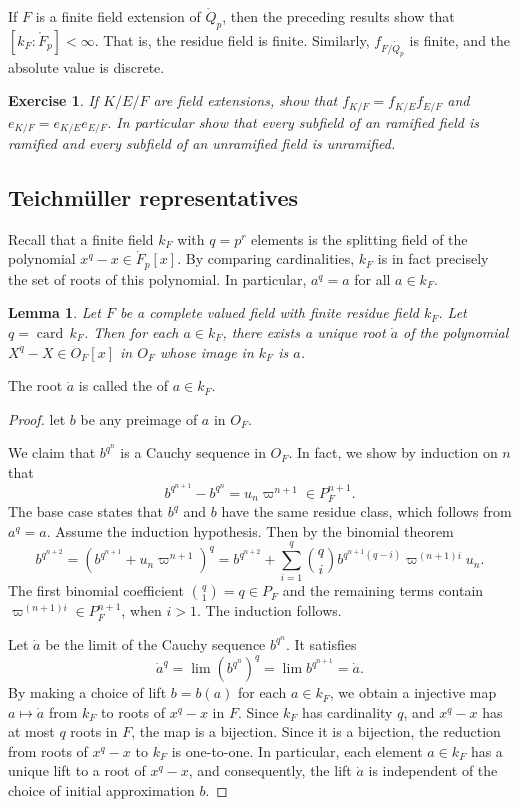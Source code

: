 \documentclass{amsart}
\newtheorem{lemma}[equation]{Lemma}
\newtheorem{exercise}{Exercise}
\def\card#1{\op{card}{#1}}
\def\op#1{{\operatorname{#1}}}
\begin{document}
If $F$ is a finite field extension of $\ring{Q}_p$, then the preceding results
show that $[k_F:\ring{F}_p]<\infty$.  That is, the residue field is finite.
Similarly, $f_{F/\ring{Q}_p}$ is finite, and the absolute value is discrete.

\begin{exercise}\label{ex:e-m}  If $K/E/F$ are field extensions, show that
$f_{K/F}=f_{K/E}f_{E/F}$ and $e_{K/F}=e_{K/E}e_{E/F}$.  In particular show
that every subfield of an ramified field is ramified and every subfield of
an unramified field is unramified.
\end{exercise}

\subsection{Teichm\"uller representatives}

Recall that a finite field $k_F$ with $q=p^r$ elements is the splitting field of 
the polynomial $x^q-x\in \ring{F}_p[x]$.  By comparing cardinalities, $k_F$ is in fact
precisely the set of roots of this polynomial.  In particular, $a^q=a$ for all
$a\in k_F$.

\begin{lemma}  Let $F$ be a complete valued field with finite residue field $k_F$.
Let $q = \card\,k_F$.  Then for each $a\in k_F$, there exists a unique root $\dot a$ of
the polynomial $X^q-X\in O_F[x]$ in $O_F$ whose image in $k_F$ is $a$.
\end{lemma}

The root $\dot a$ is called the  of $a\in k_F$.

\begin{proof} let $b$ be any preimage of $a$ in $O_F$.  

We claim that $b^{q^n}$ is a Cauchy sequence in $O_F$. In fact, we show by induction
on $n$ 
that 
\[
b^{q^{n+1}} - b^{q^n} = u_n\varpi^{n+1} \in P_F^{n+1}.
\]
The base case states that $b^q$ and $b$ have the same residue class, which follows from
 $a^q = a$.
Assume the induction hypothesis.
Then by the binomial theorem
\[
b^{q^{n+2}} = (b^{q^{n+1}} + u_n\varpi^{n+1})^q 
= b^{q^{n+2}} + {\sum_{i=1}^q {q\choose i}b^{q^{n+1}(q-i)} \varpi^{(n+1)i}u_n}.
\]
The first binomial coefficient ${q\choose 1} = q\in P_F$ and the
remaining terms contain $\varpi^{(n+1)i}\in P_F^{n+1}$, when $i>1$. The induction
follows.

Let $\dot a$ be the limit of the Cauchy sequence $b^{q^n}$. 
It satisfies
\[
\dot a ^q = \lim (b^{q^n})^q = \lim b^{q^{n+1}} = \dot a.
\]
By making a choice of lift $b=b(a)$ for each $a\in k_F$, we obtain 
 a injective map $a\mapsto \dot a$ from $k_F$ to roots of $x^q-x$ in $F$.  Since
$k_F$ has cardinality $q$, and $x^q-x$ has at most $q$ roots in $F$, 
the map is a bijection.  Since it is a bijection, the reduction from roots of
$x^q-x$ to $k_F$ is one-to-one.  In particular, each element $a\in k_F$ has a unique
lift to a root of $x^q-x$, and consequently, the lift $\dot a$ is
 independent of the choice of initial approximation $b$. 
\end{proof}
\end{document}
